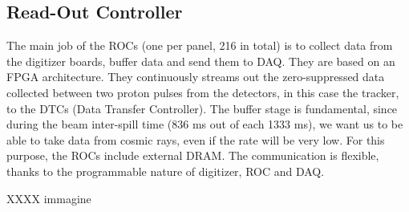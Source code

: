 \subsection{Read-Out Controller}\label{ROC} 
The main job of the ROCs (one per panel, 216 in total) is to collect data from the digitizer boards, buffer data and send them to DAQ. They are based on an FPGA architecture. They continuously streams out the zero-suppressed data collected between two proton pulses from the detectors, in this case the tracker, to the DTCs (Data Transfer Controller)\cite{GIOIOSA2023167732}. The buffer stage is fundamental, since during the beam inter-spill time (836 ms out of each 1333 ms), we want us to be able to take data from cosmic rays, even if the rate will be very low. For this purpose, the ROCs include external DRAM. The communication is flexible, thanks to the programmable nature of digitizer, ROC and DAQ. 

XXXX immagine 
